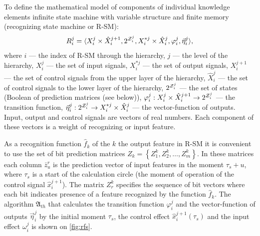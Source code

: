 \documentclass[review]{elsarticle}
\begin{document}
To define the mathematical model of components of individual knowledge elements infinite state machine with variable structure and finite memory (recognizing state machine or R-SM):
\[
	R_i^j =\langle X_i^j \times \hat X_i^{j + 1}{,2^{{\cal Z}_i^j}},X_i^{*j} \times \hat X_i^j,\varphi _i^j,\vec \eta _i^j\rangle,
\]
where $i$ --- the index of R-SM through the hierarchy, $j$ --- the level of the hierarchy, $X_i^j$ --- the set of input signals, $X_i^{*j}$ --- the set of output signals, $X_i^{j+1}$ --- the set of control signals from the upper layer of the hierarchy, $\hat X_i^j$ --- the set of control signals to the lower layer of the hierarchy, ${2^{{\cal Z}_i^j}}$ --- the set of states (Boolean of prediction matrices (see below)), $\varphi _i^j:X_i^j \times \hat X_i^{j + 1} \to {2^{{\cal Z}_i^j}}$ --- the transition function, $\vec \eta _i^j:{2^{{\cal Z}_i^j}} \to X_i^{*j} \times \hat X_i^j$ --- the vector-function of outputs. Input, output and control signals are vectors of real numbers. Each component of these vectors is a weight of recognizing or input feature.

As a recognition function ${\hat f_k}$ of the $k$ the output feature in R-SM it is convenient to use the set of bit prediction matrices ${Z_k} = \left\{ {Z_1^k,Z_2^k, \ldots ,Z_m^k} \right\}$. In these matrices each column $\bar z_u^r$ is the prediction vector of input features in the moment ${\tau _s} + u$, where ${\tau _s}$ is a start of the calculation circle (the moment of operation of the control signal $\hat x_i^{j + 1}$). The matrix $Z_r^k$ specifies the sequence of bit vectors where each bit indicates presence of a feature recognized by the function ${\hat f_k}$. The algorithm ${\mathfrak A}_{th}$ that calculates the transition function $\varphi _i^j$ and the vector-function of outputs $\vec \eta _i^j$ by the initial moment ${\tau _s}$, the control effect $\hat x_i^{j + 1}\left( {{\tau _s}} \right)$ and the input effect $\omega _i^j$ is shown on \autoref{fig:rfs}.
\end{document}
